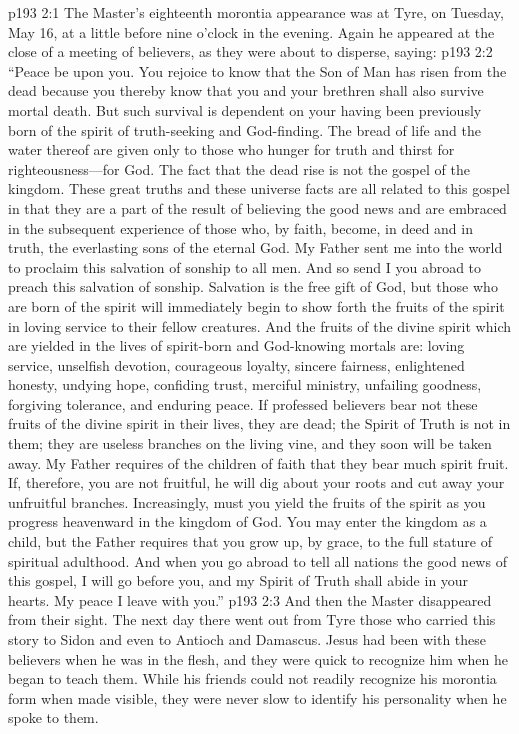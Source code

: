 \vs p193 2:1 The Master’s eighteenth morontia appearance was at Tyre, on Tuesday, May 16, at a little before nine o’clock in the evening. Again he appeared at the close of a meeting of believers, as they were about to disperse, saying:
\pc \vs p193 2:2 \textcolor{ubdarkred}{“Peace be upon you. You rejoice to know that the Son of Man has risen from the dead because you thereby know that you and your brethren shall also survive mortal death. But such survival is dependent on your having been previously born of the spirit of truth\hyp{}seeking and God\hyp{}finding. The bread of life and the water thereof are given only to those who hunger for truth and thirst for righteousness---for God. The fact that the dead rise is not the gospel of the kingdom. These great truths and these universe facts are all related to this gospel in that they are a part of the result of believing the good news and are embraced in the subsequent experience of those who, by faith, become, in deed and in truth, the everlasting sons of the eternal God. My Father sent me into the world to proclaim this salvation of sonship to all men. And so send I you abroad to preach this salvation of sonship. Salvation is the free gift of God, but those who are born of the spirit will immediately begin to show forth the fruits of the spirit in loving service to their fellow creatures. And the fruits of the divine spirit which are yielded in the lives of spirit\hyp{}born and God\hyp{}knowing mortals are: loving service, unselfish devotion, courageous loyalty, sincere fairness, enlightened honesty, undying hope, confiding trust, merciful ministry, unfailing goodness, forgiving tolerance, and enduring peace. If professed believers bear not these fruits of the divine spirit in their lives, they are dead; the Spirit of Truth is not in them; they are useless branches on the living vine, and they soon will be taken away. My Father requires of the children of faith that they bear much spirit fruit. If, therefore, you are not fruitful, he will dig about your roots and cut away your unfruitful branches. Increasingly, must you yield the fruits of the spirit as you progress heavenward in the kingdom of God. You may enter the kingdom as a child, but the Father requires that you grow up, by grace, to the full stature of spiritual adulthood. And when you go abroad to tell all nations the good news of this gospel, I will go before you, and my Spirit of Truth shall abide in your hearts. My peace I leave with you.”}
\pc \vs p193 2:3 And then the Master disappeared from their sight. The next day there went out from Tyre those who carried this story to Sidon and even to Antioch and Damascus. Jesus had been with these believers when he was in the flesh, and they were quick to recognize him when he began to teach them. While his friends could not readily recognize his morontia form when made visible, they were never slow to identify his personality when he spoke to them.\plusone

